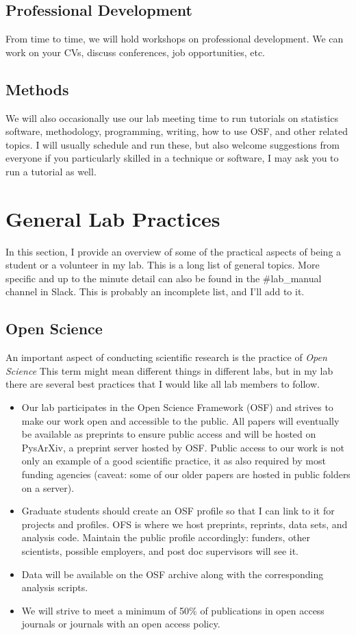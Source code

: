 \documentclass{article}
\begin{document}
\subsection {Professional Development} From time to time, we will hold workshops on professional development. We can work on your CVs, discuss conferences, job opportunities, etc. 

\subsection{Methods} We will also occasionally use our lab meeting time to run tutorials on statistics software, methodology, programming, writing, how to use OSF, and other related topics. I will usually schedule and run these, but also welcome suggestions from everyone if you particularly skilled in a technique or software, I may ask you to run a tutorial as well.

\section{General Lab Practices}\label{sec:LabPrac}
In this section, I provide an overview of some of the practical aspects of being a student or a volunteer in my lab. This is a long list of general topics. More specific and up to the minute detail can also be found in the \#lab\_manual channel in Slack. This is probably an incomplete list, and I'll add to it.


\subsection{Open Science} An important aspect of conducting scientific research is the practice of \textit{Open Science} This term might mean different things in different labs, but in my lab there are several best practices that I would like all lab members to follow. 

\begin {itemize}
\item Our lab participates in the Open Science Framework (OSF) and strives to make our work open and accessible to the public. All papers will eventually be available as preprints to ensure public access and will be hosted on PysArXiv, a preprint server hosted by OSF. Public access to our work is not only an example of a good scientific practice, it as also required by most funding agencies (caveat: some of our older papers are hosted in public folders on a server).
\item Graduate students should create an OSF profile so that I can link to it for projects and profiles. OFS is where we host preprints, reprints, data sets, and analysis code. Maintain the public profile accordingly: funders, other scientists, possible employers, and post doc supervisors will see it. 
\item Data will be available on the OSF archive along with the corresponding analysis scripts. 
\item We will strive to meet a minimum of 50\% of publications in open access journals or journals with an open access policy. 
\end{itemize}
\end{document}
